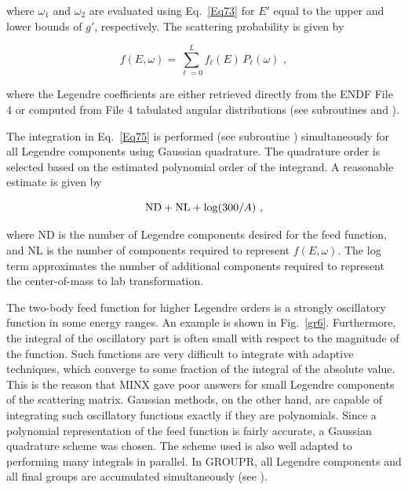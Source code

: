 \noindent
where $\omega_1$ and $\omega_2$ are evaluated using Eq.~\ref{Eq73}
for $E'$ equal to the upper and lower bounds of $g'$, respectively.
The scattering probability is given by

  \begin{equation}
    f(E,\omega)=\sum_{\ell=0}^L f_{\ell}(E)\,P_{\ell}(\omega)\,\,,
  \label{Eq76}
  \end{equation}

\noindent
where the Legendre coefficients are either retrieved directly from the
ENDF File 4 or computed from File 4 tabulated angular distributions
(see subroutines  and
).

The integration in Eq.~\ref{Eq75} is performed (see subroutine
) simultaneously for all
Legendre components using Gaussian quadrature\cite{ref13}.
  The quadrature order is selected
based on the estimated polynomial order of the integrand.  A
reasonable estimate is given by

  \begin{equation}
    {\rm ND} + {\rm NL} +\log(300/A)\,\,,
  \label{Eq77}
  \end{equation}

\noindent
where ND is the number of Legendre components desired for the feed
function, and NL is the number of components required to represent
$f(E,\omega)$.  The log term approximates the number of additional
components required to represent the center-of-mass to lab transformation.

The two-body feed function for higher Legendre orders is a strongly
oscillatory function in some energy ranges.  An example is shown in
Fig.~\ref{gr6}.  Furthermore, the integral of the oscillatory part
is often small with respect to the magnitude of the function.  Such
functions are very difficult to integrate with adaptive techniques,
which converge to some fraction of the integral of the absolute value.
This is the reason that MINX\cite{MINX} gave poor answers
for small Legendre components of the scattering matrix.  Gaussian methods,
on the other hand, are capable of integrating such oscillatory functions
exactly if they are polynomials.  Since a polynomial representation
of the feed function is fairly accurate, a Gaussian quadrature scheme
was chosen.  The scheme used is also well adapted to performing many
integrals in parallel.  In GROUPR, all Legendre components and all
final groups are accumulated simultaneously (see
).

